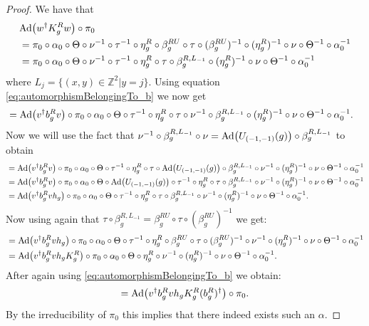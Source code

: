 \documentclass[12pt,a4paper,twoside]{article}
\let\originalleft\left
\let\originalright\right
\renewcommand{\left}{\mathopen{}\mathclose\bgroup\originalleft}
\renewcommand{\right}{\aftergroup\egroup\originalright}
\newcommand{\ZZ}{\mathbb Z}
\newcommand{\Ad}[1]{\textrm{Ad}\left(#1\right)}
\theoremstyle{definition}
\numberwithin{equation}{section}
\begin{document}
\begin{proof}
	We have that
	\begin{align}
		&\Ad{w^\dagger K_g^R w}\circ\pi_0\\
		&=\pi_0\circ\alpha_0\circ\Theta\circ\nu^{-1}\circ\tau^{-1}\circ\eta_g^R\circ\beta_g^{RU}\circ\tau\circ(\beta_g^{RU})^{-1}\circ(\eta_g^R)^{-1}\circ\nu\circ\Theta^{-1}\circ\alpha_0^{-1}\\
		&=\pi_0\circ\alpha_0\circ\Theta\circ\nu^{-1}\circ\tau^{-1}\circ\eta_g^R\circ\tau\circ\beta_g^{R,L_{-1}}\circ(\eta_g^R)^{-1}\circ\nu\circ\Theta^{-1}\circ\alpha_0^{-1}
	\end{align}
	where $L_j=\{(x,y)\in\ZZ^2|y=j\}$. Using equation \eqref{eq:automorphismBelongingTo_b} we now get
	\begin{align}
		&=\Ad{v^\dagger b_g^R v}\circ\pi_0\circ\alpha_0\circ\Theta\circ\tau^{-1}\circ\eta_g^R\circ\tau\circ\nu^{-1}\circ\beta_g^{R,L_{-1}}\circ(\eta_g^R)^{-1}\circ\nu\circ\Theta^{-1}\circ\alpha_0^{-1}.
	\end{align}
	Now we will use the fact that $\nu^{-1}\circ\beta_g^{R,L_{-1}}\circ\nu=\Ad{U_{(-1,-1)}(g)}\circ\beta_g^{R,L_{-1}}$ to obtain
	\begin{align}
		&=\Ad{v^\dagger b_g^R v}\circ\pi_0\circ\alpha_0\circ\Theta\circ\tau^{-1}\circ\eta_g^R\circ\tau\circ\Ad{U_{(-1,-1)}(g)}\circ\beta_g^{R,L_{-1}}\circ\nu^{-1}\circ(\eta_g^R)^{-1}\circ\nu\circ\Theta^{-1}\circ\alpha_0^{-1}\\
		&=\Ad{v^\dagger b_g^R v}\circ\pi_0\circ\alpha_0\circ\Theta\circ\Ad{U_{(-1,-1)}(g)}\circ\tau^{-1}\circ\eta_g^R\circ\tau\circ\beta_g^{R,L_{-1}}\circ\nu^{-1}\circ(\eta_g^R)^{-1}\circ\nu\circ\Theta^{-1}\circ\alpha_0^{-1}\\
		&=\Ad{v^\dagger b_g^R vh_g}\circ\pi_0\circ\alpha_0\circ\Theta\circ\tau^{-1}\circ\eta_g^R\circ\tau\circ\beta_g^{R,L_{-1}}\circ\nu^{-1}\circ(\eta_g^R)^{-1}\circ\nu\circ\Theta^{-1}\circ\alpha_0^{-1}.
	\end{align}
	Now using again that $\tau\circ\beta_g^{R,L_{-1}}=\beta_{g}^{RU}\circ\tau\circ(\beta_g^{RU})^{-1}$ we get:
	\begin{align}
		&=\Ad{v^\dagger b_g^R vh_g}\circ\pi_0\circ\alpha_0\circ\Theta\circ\tau^{-1}\circ\eta_g^R\circ\beta_{g}^{RU}\circ\tau\circ(\beta_g^{RU})^{-1}\circ\nu^{-1}\circ(\eta_g^R)^{-1}\circ\nu\circ\Theta^{-1}\circ\alpha_0^{-1}\\
		&=\Ad{v^\dagger b_g^R vh_gK_g^R}\circ\pi_0\circ\alpha_0\circ\Theta\circ\eta_g^R\circ\nu^{-1}\circ(\eta_g^R)^{-1}\circ\nu\circ\Theta^{-1}\circ\alpha_0^{-1}.
	\end{align}
	After again using \eqref{eq:automorphismBelongingTo_b} we obtain:
	\begin{align}
		=\Ad{v^\dagger b_g^R vh_gK_g^R(b_g^R)^\dagger}\circ\pi_0.
	\end{align}
	By the irreducibility of $\pi_0$ this implies that there indeed exists such an $\alpha$.
\end{proof}
\end{document}
